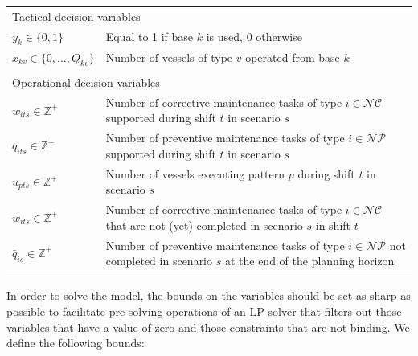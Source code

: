 \begin{tabular}{ll}
	\\
	\multicolumn{2}{l}{Tactical decision variables}\\
	$y_{k} \in \{0,1\}$ 	& Equal to 1 if base $k$ is used, 0 otherwise\\
	$x_{kv} \in\{0,\ldots,Q_{kv}\}$ &	Number of vessels of type $v$ operated from base $k$\\
	\\

	\multicolumn{2}{l}{Operational decision variables}\\
	$w_{its}\in\mathbb{Z}^+$	&	\parbox[t]{9.5cm}{Number of corrective maintenance tasks of type  $i \in\mathcal{NC}$ supported during shift $t$ in scenario $s$}\\
	$q_{its} \in\mathbb{Z}^+$	&	\parbox[t]{9.5cm}{Number of preventive maintenance tasks of type $i \in \mathcal{NP}$ supported during shift $t$ in scenario $s$}\\
	$u_{pts}\in\mathbb{Z}^+$ &	\parbox[t]{9.5cm}{Number of vessels executing pattern $p$ during shift $t$ in scenario $s$}\\
	$\bar{w}_{its}\in\mathbb{Z}^+$	&	\parbox[t]{9.5cm}{Number of corrective maintenance tasks of type  $i \in\mathcal{NC}$ that are not (yet) completed in scenario $s$ in shift $t$}\\
	$\bar{q}_{i s}\in\mathbb{Z}^+$	&	\parbox[t]{9.5cm}{Number of preventive maintenance tasks of type $i \in \mathcal{NP}$ not completed in scenario $s$ at the end of the planning horizon}  \\
								\\	
\end{tabular}

In order to solve the model, the bounds on the variables should be set as sharp as possible to facilitate pre-solving operations of an LP solver that filters out those variables that have a value of zero and those constraints that are not binding. We define the following bounds:


